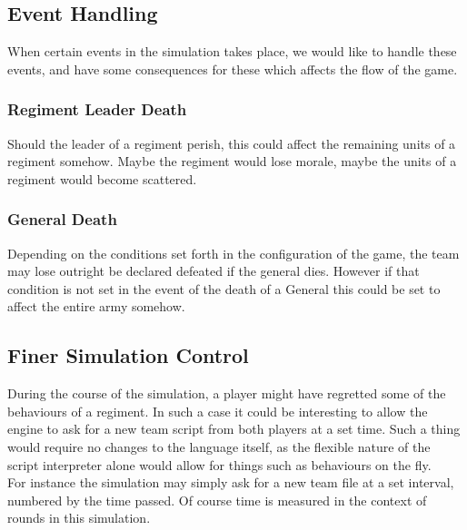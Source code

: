 \subsection{Event Handling}
When certain events in the simulation takes place, we would like to handle these events, and have some consequences for these which affects the flow of the game.
\subsubsection*{Regiment Leader Death}
Should the leader of a regiment perish, this could affect the remaining units of a regiment somehow. Maybe the regiment would lose morale, maybe the units of a regiment would become scattered.
\subsubsection*{General Death}
Depending on the conditions set forth in the configuration of the game, the team may lose outright be declared defeated if the general dies. However if that condition is not set in the event of the death of a General this could be set to affect the entire army somehow. 
\subsection{Finer Simulation Control}
During the course of the simulation, a player might have regretted some of the behaviours of a regiment. In such a case it could be interesting to allow the engine to ask for a new team script from both players at a set time. Such a thing would require no changes to the language itself, as the flexible nature of the script interpreter alone would allow for things such as behaviours on the fly. \\
For instance the simulation may simply ask for a new team file at a set interval, numbered by the time passed. Of course time is measured in the context of rounds in this simulation.